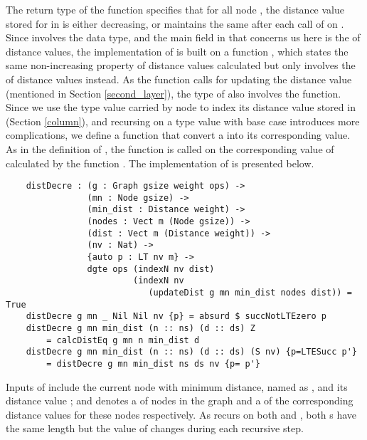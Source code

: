 The return type of the  function specifies that for all node , the distance value stored for  in  is either decreasing, or maintains the same after each call of  on . Since  involves the  data type, and the main field in  that concerns us here is the  of distance values, the implementation of  is built on a function , which states the same non-increasing property of distance values calculated but only involves the  of distance values instead. 
As the function  calls  for updating the distance value  (mentioned in Section \ref{second_layer}), the type of  also involves the  function. Since we use the  type value carried by node  to index its distance value stored in  (Section \ref{column}), and recursing on a  type value with base case  introduces more complications, we define a  function that convert a  into its corresponding  value. As in the definition of , the  function is called on the corresponding  value of  calculated by the function . The implementation of  is presented below.
\begin{lstlisting}
	distDecre : (g : Graph gsize weight ops) ->
	            (mn : Node gsize) ->
	            (min_dist : Distance weight) ->
	            (nodes : Vect m (Node gsize)) ->
	            (dist : Vect m (Distance weight)) ->
	            (nv : Nat) ->
	            {auto p : LT nv m} ->
	            dgte ops (indexN nv dist) 
	            		 (indexN nv 
	            		 	(updateDist g mn min_dist nodes dist)) = True
	distDecre g mn _ Nil Nil nv {p} = absurd $ succNotLTEzero p
	distDecre g mn min_dist (n :: ns) (d :: ds) Z 
		= calcDistEq g mn n min_dist d
	distDecre g mn min_dist (n :: ns) (d :: ds) (S nv) {p=LTESucc p'} 
		= distDecre g mn min_dist ns ds nv {p= p'}
\end{lstlisting}

Inputs of  include the current node with minimum distance, named as , and its distance value ;  and  denotes a  of nodes in the graph and a  of the corresponding distance values for these nodes respectively. As  recurs on both  and , both s have the same length  but the value of  changes during each recursive step. 
\\

